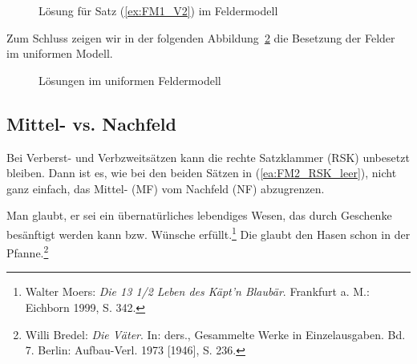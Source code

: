 \begin{figure}[!htbp]
  \centering
  \caption{Lösung für Satz (\ref{ex:FM1_V2}) im Feldermodell}
  \label{fig:FM4}
\end{figure}

Zum Schluss zeigen wir in der folgenden Abbildung~\ref{fig:FM5} die Besetzung der Felder im uniformen Modell.  

\begin{figure}[!htbp]
  \centering
  \caption{Lösungen im uniformen Feldermodell}
  \label{fig:FM5}
\end{figure}


\subsection{Mittel- vs. Nachfeld}\label{subsection:FM2}
\largerpage
Bei Verberst- und Verbzweitsätzen kann die rechte Satzklammer (RSK) unbesetzt bleiben. Dann ist es, wie bei den beiden Sätzen in (\ref{ea:FM2_RSK_leer}), nicht ganz einfach, das Mittel- (MF) vom Nachfeld (NF) abzugrenzen.

\ea \label{ea:FM2_RSK_leer}
\ea \label{ea:FM2_RSK_leer1} Man glaubt, er sei ein übernatürliches lebendiges Wesen, das durch Geschenke besänftigt werden kann bzw. Wünsche erfüllt.\footnote{Walter Moers: \textit{Die 13 1/2 Leben des Käpt'n Blaubär}. Frankfurt a. M.: Eichborn 1999, S. 342.}
\ex \label{ex:FM2_RSK_leer2} Die glaubt den Hasen schon in der Pfanne.\footnote{Willi Bredel: \textit{Die Väter}. In: ders., Gesammelte Werke in Einzelausgaben. Bd. 7. Berlin: Aufbau-Verl. 1973 [1946], S. 236.}
\z 
\z 

